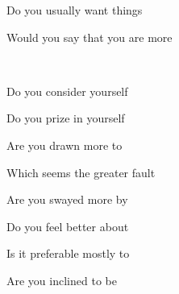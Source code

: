\documentclass[english,pdf,pagemark,stamp,globalid=\candidateID,oneside,PrintQuestionnaireId=False]{sdaps}
\begin{document}
\begin{questionnaire}
\begin{multicols}{2}
\begin{choicequestion}[2]{Do you usually want things}
\end{choicequestion}

\begin{choicequestion}[2]{Would you say that you are more}
\end{choicequestion}
\\
\begin{choicequestion}[2]{Do you consider yourself}
\end{choicequestion}

\begin{choicequestion}[2]{Do you prize in yourself}
\end{choicequestion}

\begin{choicequestion}[2]{Are you drawn more to}
\end{choicequestion}

\begin{choicequestion}[2]{Which seems the greater fault}
\end{choicequestion}

\begin{choicequestion}[2]{Are you swayed more by}
\end{choicequestion}

\begin{choicequestion}[2]{Do you feel better about}
\end{choicequestion}

\begin{choicequestion}[2]{Is it preferable mostly to}
\end{choicequestion}

\begin{choicequestion}[2]{Are you inclined to be}
\end{choicequestion}


\end{multicols}
\end{questionnaire}
\end{document}
